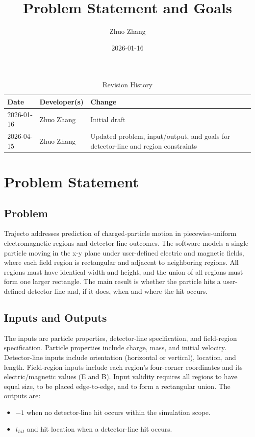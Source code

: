 \documentclass{article}
\title{Problem Statement and Goals\\\progname}
\author{Zhuo Zhang}
\date{2026-01-16}
\begin{document}
\maketitle

\begin{table}[hp]
\caption{Revision History} \label{TblRevisionHistory}
\begin{tabularx}{\textwidth}{llX}
\toprule
\textbf{Date} & \textbf{Developer(s)} & \textbf{Change}\\
\midrule
2026-01-16 & Zhuo Zhang & Initial draft\\
2026-04-15 & Zhuo Zhang & Updated problem, input/output, and goals for detector-line and region constraints\\
\bottomrule
\end{tabularx}
\end{table}

\section{Problem Statement}

\subsection{Problem}

Trajecto addresses prediction of charged-particle motion in piecewise-uniform
electromagnetic regions and detector-line outcomes. The software models a
single particle moving in the x-y plane under user-defined electric and magnetic
fields, where each field region is rectangular and adjacent to neighboring
regions. All regions must have identical width and height, and the union of all
regions must form one larger rectangle. The main result is whether the particle
hits a user-defined detector line and, if it does, when and where the hit occurs.


\subsection{Inputs and Outputs}

The inputs are particle properties, detector-line specification, and field-region
specification. Particle properties include charge, mass, and initial velocity.
Detector-line inputs include orientation (horizontal or vertical), location, and
length. Field-region inputs include each region's four-corner coordinates and
its electric/magnetic values (E and B). Input validity requires all regions to
have equal size, to be placed edge-to-edge, and to form a rectangular union.
The outputs are:
\begin{itemize}
\item $-1$ when no detector-line hit occurs within the simulation scope.
\item $t_{hit}$ and hit location when a detector-line hit occurs.
\end{itemize}
\end{document}

